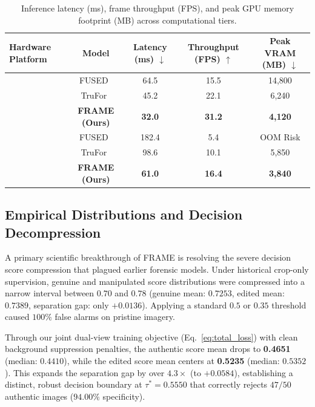 \begin{table}[t]
\centering\small
\caption{Inference latency (ms), frame throughput (FPS), and peak GPU memory footprint (MB) across computational tiers.}
\label{tab:hardware_profile}
\begin{tabular}{@{}lcccc@{}}
\toprule
Hardware Platform & Model & Latency (ms) $\downarrow$ & Throughput (FPS) $\uparrow$ & Peak VRAM (MB) $\downarrow$ \\
\midrule
{} 
& FUSED~\cite{fused} & 64.5 & 15.5 & 14,800 \\
& TruFor~\cite{trufor} & 45.2 & 22.1 & 6,240 \\
& \textbf{FRAME (Ours)} & \textbf{32.0} & \textbf{31.2} & \textbf{4,120} \\
\midrule
{} 
& FUSED~\cite{fused} & 182.4 & 5.4 & OOM Risk \\
& TruFor~\cite{trufor} & 98.6 & 10.1 & 5,850 \\
& \textbf{FRAME (Ours)} & \textbf{61.0} & \textbf{16.4} & \textbf{3,840} \\
\bottomrule
\end{tabular}
\end{table}

\subsection{Empirical Distributions and Decision Decompression}
\label{sec:empirical_distributions}

A primary scientific breakthrough of FRAME is resolving the severe decision score compression that plagued earlier forensic models. Under historical crop-only supervision, genuine and manipulated score distributions were compressed into a narrow interval between $0.70$ and $0.78$ (genuine mean: $0.7253$, edited mean: $0.7389$, separation gap: only $+0.0136$). Applying a standard $0.5$ or $0.35$ threshold caused $100\%$ false alarms on pristine imagery.

Through our joint dual-view training objective (Eq.~\eqref{eq:total_loss}) with clean background suppression penalties, the authentic score mean drops to \textbf{0.4651} (median: $0.4410$), while the edited score mean centers at \textbf{0.5235} (median: $0.5352$). This expands the separation gap by over \textbf{$4.3\times$} (to $+0.0584$), establishing a distinct, robust decision boundary at $\tau^* = 0.5550$ that correctly rejects $47/50$ authentic images ($94.00\%$ specificity).


